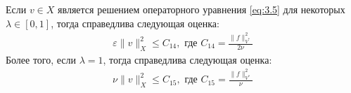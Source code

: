 \begin{theorem}\label{tm:3.1}
    Если $v\in X$ является решением операторного уравнения \ref{eq:3.5} для некоторых $\lambda\in [0,1]$, тогда справедлива следующая оценка:
    \begin{equation}\label{eq:3.6}
        \begin{gathered}
            \varepsilon\|v\|^2_X\leqslant C_{14}, \textrm{ где } C_{14}=\frac{\|f\|^2_{V^*}}{2\nu}
        \end{gathered}
    \end{equation}
    Более того, если $\lambda = 1$, тогда справедлива следующая оценка:
    \begin{equation}\label{eq:3.7}
        \begin{gathered}
            \nu\|v\|^2_X\leqslant C_{15}, \textrm{ где } C_{15}=\frac{\|f\|^2_{V^*}}{\nu}
        \end{gathered}
    \end{equation}
\end{theorem}

